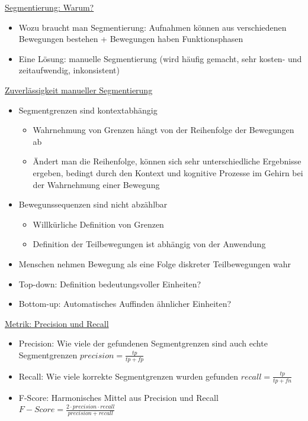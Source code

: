 \documentclass[a4paper,10pt,oneside]{article}
\begin{document}
\underline{Segmentierung: Warum?} \\
	\begin{itemize}
		\item Wozu braucht man Segmentierung: Aufnahmen können aus verschiedenen Bewegungen bestehen + Bewegungen haben Funktionsphasen
		\item Eine Lösung: manuelle Segmentierung (wird häufig gemacht, sehr kosten- und zeitaufwendig, inkonsistent)
	\end{itemize}
	
\underline{Zuverlässigkeit manueller Segmentierung} \\
	\begin{itemize}
		\item Segmentgrenzen sind kontextabhängig
			\begin{itemize}
				\item Wahrnehmung von Grenzen hängt von der Reihenfolge der Bewegungen ab
				\item Ändert man die Reihenfolge, können sich sehr unterschiedliche Ergebnisse ergeben, bedingt durch den Kontext und kognitive Prozesse im Gehirn bei der Wahrnehmung einer Bewegung
			\end{itemize}
		\item Bewegunssequenzen sind nicht abzählbar
			\begin{itemize}
				\item Willkürliche Definition von Grenzen
				\item Definition der Teilbewegungen ist abhängig von der Anwendung
			\end{itemize}
		\item Menschen nehmen Bewegung als eine Folge diskreter Teilbewegungen wahr
		\item Top-down: Definition bedeutungsvoller Einheiten?
		\item Bottom-up: Automatisches Auffinden ähnlicher Einheiten?
	\end{itemize}
 		
\underline{Metrik: Precision und Recall} \\	
 	\begin{itemize}
 		\item Precision: Wie viele der gefundenen Segmentgrenzen sind auch echte Segmentgrenzen $precision = \frac{tp}{tp + fp}$
 		\item Recall: Wie viele korrekte Segmentgrenzen wurden gefunden $recall = \frac{tp}{tp + fn}$
 		\item F-Score: Harmonisches Mittel aus Precision und Recall $F-Score= \frac{2 \cdot precision \cdot recall}{precision + recall}$
 	\end{itemize}
 		
\end{document}
